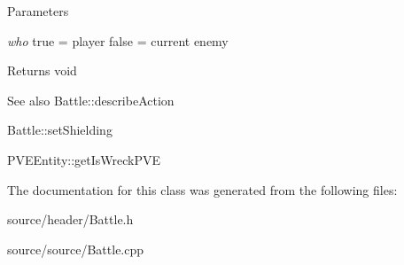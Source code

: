 \begin{DoxyParams}{Parameters}
\item[{\em who}]true = player false = current enemy\end{DoxyParams}
\begin{DoxyReturn}{Returns}
void
\end{DoxyReturn}
\begin{DoxySeeAlso}{See also}
Battle::describeAction 

Battle::setShielding

PVEEntity::getIsWreckPVE 
\end{DoxySeeAlso}


The documentation for this class was generated from the following files:\begin{DoxyCompactItemize}
\item 
source/header/Battle.h\item 
source/source/Battle.cpp\end{DoxyCompactItemize}

